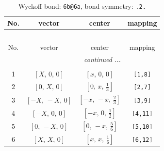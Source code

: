 \documentclass[fleqn,8pt]{jsarticle}
\begin{document}
\begin{longtable}{cccc}
\caption{Wyckoff bond: {\tt 6b@6a}, bond symmetry: {\tt .2.}}
 \\
 \hline \hline
No. & vector & center & mapping \\ \hline \endfirsthead

\multicolumn{3}{l}{\tablename\ \thetable{}} \\
 \hline \hline
No. & vector & center & mapping \\ \hline \endhead

 \hline \hline
\multicolumn{3}{r}{\footnotesize\it continued ...} \\ \endfoot

 \hline \hline
\multicolumn{3}{r}{} \\ \endlastfoot

1 & $\left[ X,\, 0,\, 0 \right]$ & $\left[ x,\, 0,\, 0 \right]$ & {\tt [1,8]} \\ \hline
2 & $\left[ 0,\, X,\, 0 \right]$ & $\left[ 0,\, x,\, \frac{1}{3} \right]$ & {\tt [2,7]} \\ \hline
3 & $\left[ - X,\, - X,\, 0 \right]$ & $\left[ - x,\, - x,\, \frac{2}{3} \right]$ & {\tt [3,9]} \\ \hline
4 & $\left[ - X,\, 0,\, 0 \right]$ & $\left[ - x,\, 0,\, \frac{1}{2} \right]$ & {\tt [4,11]} \\ \hline
5 & $\left[ 0,\, - X,\, 0 \right]$ & $\left[ 0,\, - x,\, \frac{5}{6} \right]$ & {\tt [5,10]} \\ \hline
6 & $\left[ X,\, X,\, 0 \right]$ & $\left[ x,\, x,\, \frac{1}{6} \right]$ & {\tt [6,12]} \\
\end{longtable}
\renewcommand{\arraystretch}{1.2}
\end{document}
